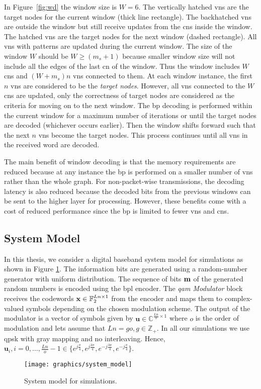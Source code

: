 In Figure~\ref{fig:wd} the window size is $W=6$. The vertically hatched \acp{vn} are the target nodes for the current window (thick line rectangle). The backhatched \acp{vn} are outside the window but still receive updates from the \acp{cn} inside the window. The hatched \acp{vn} are the target nodes for the next window (dashed rectangle). All \acp{vn} with patterns are updated during the current window. The size of the window $W$ should be $W\geq (m_s+1)$ because smaller window size will not include all the edges of the last \ac{cn} of the window. Thus the window includes $W$ \acp{cn} and $(W+m_s)n$ \acp{vn} connected to them. At each window instance, the first $n$ \acp{vn} are considered to be the \emph{target nodes}. However, all \acp{vn} connected to the $W$ \acp{cn} are updated, only the correctness of target nodes are considered as the criteria for moving on to the next window. The \ac{bp} decoding is performed within the current window for a maximum number of iterations or until the target nodes are decoded (whichever occurs earlier). Then the window shifts forward such that the next $n$ \acp{vn} become the target nodes. This process continues until all \acp{vn} in the received word are decoded.

The main benefit of window decoding is that the memory requirements are reduced because at any instance the \ac{bp} is performed on a smaller number of \acp{vn} rather than the whole graph. For non-packet-wise transmissions, the decoding latency is also reduced because the decoded bits from the previous windows can be sent to the higher layer for processing. However, these benefits come with a cost of reduced performance since the \ac{bp} is limited to fewer \acp{vn} and \acp{cn}.

\subsection{System Model}\label{sec:sys_mod}
In this thesis, we consider a digital baseband system model for simulations as shown in Figure \ref{fig:system}. The information bits are generated using a random-number generator with uniform distribution. The sequence of bits $\mathbf{m}$ of the generated random numbers is encoded using the \ac{bpl} encoder. The \emph{\ac{qam} Modulator} block receives the codewords $\mathbf{x}\in\mathbb{F}_2^{Ln\times 1}$ from the encoder and maps them to complex-valued symbols depending on the chosen modulation scheme. The output of the modulator is a vector of symbols given by $\mathbf{u}\in\mathbb{C}^{\frac{Ln}{o}\times 1}$ where $o$ is the order of modulation and lets assume that $Ln=go, g\in\mathbb{Z}_+$. In all our simulations we use \ac{qpsk} with gray mapping and no interleaving. Hence, $\mathbf{u}_i,i=0,\dots,\frac{Ln}{o}-1\in\{e^{j\frac{\pi}{4}},e^{j\frac{3\pi}{4}},e^{-j\frac{3\pi}{4}},e^{-j\frac{\pi}{4}}\}$.
\begin{figure}[htbp]
  \centering
  \texttt{[image: graphics/system\_model]}
  \caption{System model for simulations.}
  \label{fig:system}
\end{figure}

